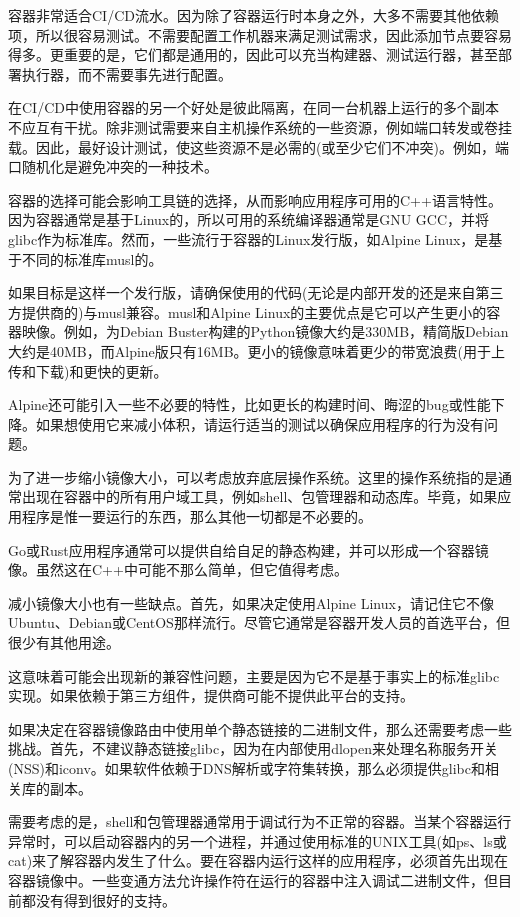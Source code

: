 
容器非常适合CI/CD流水。因为除了容器运行时本身之外，大多不需要其他依赖项，所以很容易测试。不需要配置工作机器来满足测试需求，因此添加节点要容易得多。更重要的是，它们都是通用的，因此可以充当构建器、测试运行器，甚至部署执行器，而不需要事先进行配置。

在CI/CD中使用容器的另一个好处是彼此隔离，在同一台机器上运行的多个副本不应互有干扰。除非测试需要来自主机操作系统的一些资源，例如端口转发或卷挂载。因此，最好设计测试，使这些资源不是必需的(或至少它们不冲突)。例如，端口随机化是避免冲突的一种技术。


容器的选择可能会影响工具链的选择，从而影响应用程序可用的C++语言特性。因为容器通常是基于Linux的，所以可用的系统编译器通常是GNU GCC，并将glibc作为标准库。然而，一些流行于容器的Linux发行版，如Alpine Linux，是基于不同的标准库musl的。

如果目标是这样一个发行版，请确保使用的代码(无论是内部开发的还是来自第三方提供商的)与musl兼容。musl和Alpine Linux的主要优点是它可以产生更小的容器映像。例如，为Debian Buster构建的Python镜像大约是330MB，精简版Debian大约是40MB，而Alpine版只有16MB。更小的镜像意味着更少的带宽浪费(用于上传和下载)和更快的更新。

Alpine还可能引入一些不必要的特性，比如更长的构建时间、晦涩的bug或性能下降。如果想使用它来减小体积，请运行适当的测试以确保应用程序的行为没有问题。

为了进一步缩小镜像大小，可以考虑放弃底层操作系统。这里的操作系统指的是通常出现在容器中的所有用户域工具，例如shell、包管理器和动态库。毕竟，如果应用程序是惟一要运行的东西，那么其他一切都是不必要的。

Go或Rust应用程序通常可以提供自给自足的静态构建，并可以形成一个容器镜像。虽然这在C++中可能不那么简单，但它值得考虑。

减小镜像大小也有一些缺点。首先，如果决定使用Alpine Linux，请记住它不像Ubuntu、Debian或CentOS那样流行。尽管它通常是容器开发人员的首选平台，但很少有其他用途。

这意味着可能会出现新的兼容性问题，主要是因为它不是基于事实上的标准glibc实现。如果依赖于第三方组件，提供商可能不提供此平台的支持。

如果决定在容器镜像路由中使用单个静态链接的二进制文件，那么还需要考虑一些挑战。首先，不建议静态链接glibc，因为在内部使用dlopen来处理名称服务开关(NSS)和iconv。如果软件依赖于DNS解析或字符集转换，那么必须提供glibc和相关库的副本。

需要考虑的是，shell和包管理器通常用于调试行为不正常的容器。当某个容器运行异常时，可以启动容器内的另一个进程，并通过使用标准的UNIX工具(如ps、ls或cat)来了解容器内发生了什么。要在容器内运行这样的应用程序，必须首先出现在容器镜像中。一些变通方法允许操作符在运行的容器中注入调试二进制文件，但目前都没有得到很好的支持。

